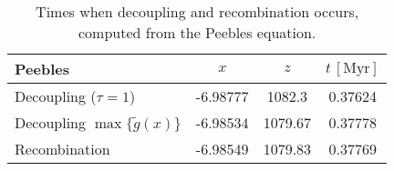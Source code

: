 \begin{table}[h]
\centering
\caption{Times when decoupling and recombination occurs, computed from the Peebles equation.}
\label{tab:M2:results:dec_and_rec_times_Peebles}
\begin{tabular}{l|ccc}
\toprule
                            Peebles &      $x$ &     $z$ & $t\,\mathrm{[Myr]}$ \\
\midrule
              Decoupling ($\tau=1$) & -6.98777 &  1082.3 &             0.37624 \\
Decoupling $\max\{ \tilde{g}(x) \}$ & -6.98534 & 1079.67 &             0.37778 \\
                      Recombination & -6.98549 & 1079.83 &             0.37769 \\
\bottomrule
\end{tabular}
\end{table}
